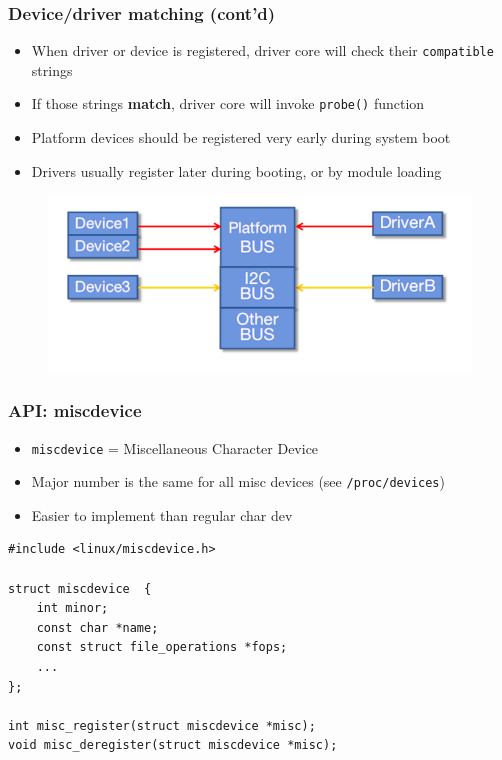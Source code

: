 \begin{frame}
  \frametitle{Device/driver matching (cont'd)}
  \begin{itemize}
    \item When driver or device is registered, driver core will check their
          \alert{\texttt{compatible}} strings
    \item If those strings \textbf{match}, driver core will invoke
          \texttt{probe()} function
    \item Platform devices should be registered very early during system boot
    \item Drivers usually register later during booting, or by module loading
  \end{itemize}
  \begin{figure}
    \centering
    \includegraphics[scale=1.8]{images/platform-bus.png}
  \end{figure}
  \vspace*{-10mm}
\end{frame}

\begin{frame}[containsverbatim]
  \frametitle{API: miscdevice}
  \begin{itemize}
    \item \texttt{miscdevice} = Miscellaneous Character Device
    \item Major number is the same for all misc devices (see
          \texttt{/proc/devices})
    \item Easier to implement than regular char dev
  \end{itemize}

  \begin{lstlisting}[style=c,numbers=none]
#include <linux/miscdevice.h>

struct miscdevice  {
	int minor;
	const char *name;
	const struct file_operations *fops;
	...
};

int misc_register(struct miscdevice *misc);
void misc_deregister(struct miscdevice *misc);
  \end{lstlisting}
\end{frame}


